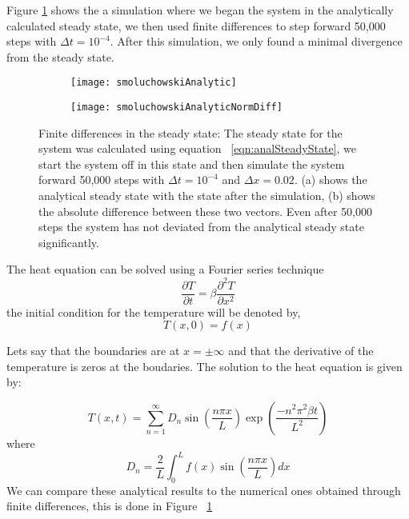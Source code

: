 Figure \ref{fig:smoluchowskiCompare} shows the a simulation where we began the system in the analytically calculated steady state, we then used finite differences to step forward 50,000 steps with $\Delta t = 10^{-4}$. After this simulation, we only found a minimal divergence from the steady state.
\begin{figure}
	\begin{subfigure}{0.49\textwidth}
	\texttt{[image: smoluchowskiAnalytic]}
	\end{subfigure}
	\begin{subfigure}{0.49\textwidth}
	\texttt{[image: smoluchowskiAnalyticNormDiff]}
	\end{subfigure}
	\caption{Finite differences in the steady state: The steady state for the system was calculated using equation ~\ref{eqn:analSteadyState}, we start the system off in this state and then simulate the system forward 50,000 steps with $\Delta t = 10^{-4}$ and $\Delta x = 0.02$. (a) shows the analytical steady state with the state after the simulation, (b) shows the absolute difference between these two vectors. Even after 50,000 steps the system has not deviated from the analytical steady state significantly. \label{fig:smoluchowskiCompare}}
\end{figure}

The heat equation can be solved using a Fourier series technique
\begin{equation}
\frac{\partial T}{\partial t} = \beta \frac{\partial^2 T}{\partial x^2}
\end{equation}
the initial condition for the temperature will be denoted by,
\begin{equation}
T(x, 0) = f(x)
\end{equation}

Lets say that the boundaries are at $x = \pm \infty$ and that the derivative of the temperature is zeros at the boudaries. The solution to the heat equation is given by:

\begin{equation}
T(x, t) = \sum_{n=1}^\infty D_n \sin \left(\frac{n \pi x}{L} \right) \exp\left(\frac{-n^2 \pi^2 \beta t}{L^2}\right)  \label{eqn:analTemperature}
\end{equation}
where
\begin{equation}
D_n = \frac{2}{L} \int_0^L f(x) \sin \left(\frac{n \pi x}{L} \right) dx
\end{equation}
We can compare these analytical results to the numerical ones obtained through finite differences, this is done in Figure ~\ref{fig:smoluchowskiCompare}

